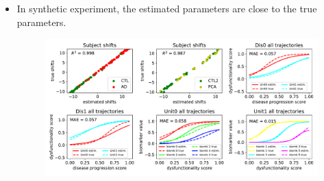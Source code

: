 \documentclass[portrait,a0,final,20pt]{a0poster}
\newcommand{\fnt}[1]{\LARGE{#1}}
\begin{document}
{\begin{multicols}{2}
% 
% 
% 

\columnbreak


\vspace{0.6em}
\begin{itemize}
 \item \fnt{In synthetic experiment, the estimated parameters are close to the true parameters.}
\begin{figure}[H]
\includegraphics[width=\columnwidth]{../figures/compTrueParams105_synth1_JMD.pdf}
  \label{fig:dktSynthTrajCompTrue}
\end{figure}


\end{itemize}
\end{multicols}}
\end{document}
